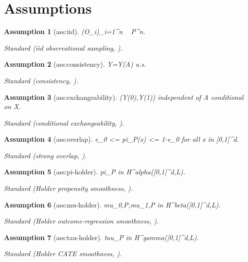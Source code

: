 \documentclass{article}
\newtheorem{assumption}{Assumption}
\begin{document}
\section{Assumptions}

\begin{assumption}[ass:iid]\label{ass:iid}
(O_i)_{i=1}^n ~ P^n.
\par\smallskip\noindent\emph{Standard} (iid observational sampling, \cite{KennedyBalakrishnanRobinsWasserman2024MinimaxCATE}).
\end{assumption}

\begin{assumption}[ass:consistency]\label{ass:consistency}
Y=Y(A) a.s.
\par\smallskip\noindent\emph{Standard} (consistency, \cite{ImbensRubin2015CausalInference}).
\end{assumption}

\begin{assumption}[ass:exchangeability]\label{ass:exchangeability}
(Y(0),Y(1)) independent of A conditional on X.
\par\smallskip\noindent\emph{Standard} (conditional exchangeability, \cite{ImbensRubin2015CausalInference}).
\end{assumption}

\begin{assumption}[ass:overlap]\label{ass:overlap}
e_0 <= pi_P(x) <= 1-e_0 for all x in [0,1]^d.
\par\smallskip\noindent\emph{Standard} (strong overlap, \cite{KennedyBalakrishnanRobinsWasserman2024MinimaxCATE}).
\end{assumption}

\begin{assumption}[ass:pi-holder]\label{ass:pi-holder}
pi_P in H^alpha([0,1]^d,L).
\par\smallskip\noindent\emph{Standard} (Holder propensity smoothness, \cite{KennedyBalakrishnanRobinsWasserman2024MinimaxCATE}).
\end{assumption}

\begin{assumption}[ass:mu-holder]\label{ass:mu-holder}
mu_{0,P},mu_{1,P} in H^beta([0,1]^d,L).
\par\smallskip\noindent\emph{Standard} (Holder outcome-regression smoothness, \cite{KennedyBalakrishnanRobinsWasserman2024MinimaxCATE}).
\end{assumption}

\begin{assumption}[ass:tau-holder]\label{ass:tau-holder}
tau_P in H^gamma([0,1]^d,L).
\par\smallskip\noindent\emph{Standard} (Holder CATE smoothness, \cite{KennedyBalakrishnanRobinsWasserman2024MinimaxCATE}).
\end{assumption}
\end{document}
